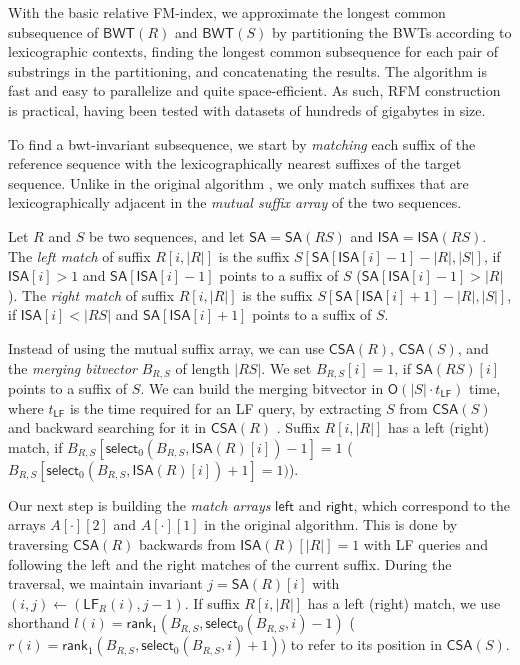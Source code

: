 \documentclass[a4paper,11pt]{llncs}
\newcommand{\abs}[1]{\ensuremath{\lvert #1 \rvert}}
\newcommand{\BWT}{\textsf{BWT}}
\newcommand{\RFM}{\textsf{RFM}}
\newcommand{\mSA}{\ensuremath{\mathsf{SA}}}
\newcommand{\mISA}{\ensuremath{\mathsf{ISA}}}
\newcommand{\mBWT}{\ensuremath{\mathsf{BWT}}}
\newcommand{\mCSA}{\ensuremath{\mathsf{CSA}}}
\newcommand{\mleft}{\ensuremath{\mathsf{left}}}
\newcommand{\mright}{\ensuremath{\mathsf{right}}}
\newcommand{\LF}{\textsf{LF}}
\newcommand{\mLF}{\ensuremath{\mathsf{LF}}}
\newcommand{\mrank}{\ensuremath{\mathsf{rank}}}
\newcommand{\mselect}{\ensuremath{\mathsf{select}}}
\newcommand{\Oh}{\ensuremath{\mathsf{O}}}
\begin{document}
With the basic relative FM-index, we approximate the longest common subsequence of $\mBWT(R)$ and $\mBWT(S)$ by partitioning the \BWT{}s according to lexicographic contexts, finding the longest common subsequence for each pair of substrings in the partitioning, and concatenating the results. The algorithm is fast and easy to parallelize and quite space-efficient. As such, \RFM{} construction is practical, having been tested with datasets of hundreds of gigabytes in size.

To find a bwt-invariant subsequence, we start by \emph{matching} each suffix of the reference sequence with the lexicographically nearest suffixes of the target sequence. Unlike in the original algorithm \cite{Belazzougui2014}, we only match suffixes that are lexicographically adjacent in the \emph{mutual suffix array} of the two sequences.

\begin{definition}
Let $R$ and $S$ be two sequences, and let $\mSA = \mSA(RS)$ and $\mISA = \mISA(RS)$. The \emph{left match} of suffix $R[i,\abs{R}]$ is the suffix $S[\mSA[\mISA[i]-1] - \abs{R}, \abs{S}]$, if $\mISA[i] > 1$ and $\mSA[\mISA[i]-1]$ points to a suffix of $S$ ($\mSA[\mISA[i]-1] > \abs{R}$). The \emph{right match} of suffix $R[i,\abs{R}]$ is the suffix $S[\mSA[\mISA[i]+1] - \abs{R}, \abs{S}]$, if $\mISA[i] < \abs{RS}$ and $\mSA[\mISA[i]+1]$ points to a suffix of $S$.
\end{definition}

Instead of using the mutual suffix array, we can use $\mCSA(R)$, $\mCSA(S)$, and the \emph{merging bitvector} $B_{R,S}$ of length $\abs{RS}$. We set $B_{R,S}[i] = 1$, if $\mSA(RS)[i]$ points to a suffix of $S$. We can build the merging bitvector in $\Oh(\abs{S} \cdot t_{\mLF})$ time, where $t_{\mLF}$ is the time required for an \LF{} query, by extracting $S$ from $\mCSA(S)$ and backward searching for it in $\mCSA(R)$ \cite{Siren2009}. Suffix $R[i,\abs{R}]$ has a left (right) match, if $B_{R,S}[\mselect_{0}(B_{R,S}, \mISA(R)[i])-1] = 1$ ($B_{R,S}[\mselect_{0}(B_{R,S}, \mISA(R)[i])+1] = 1)$).

Our next step is building the \emph{match arrays} $\mleft$ and $\mright$, which correspond to the arrays $A[\cdot][2]$ and $A[\cdot][1]$ in the original algorithm. This is done by traversing $\mCSA(R)$ backwards from $\mISA(R)[\abs{R}] = 1$ with \LF{} queries and following the left and the right matches of the current suffix. During the traversal, we maintain invariant $j = \mSA(R)[i]$ with $(i,j) \leftarrow (\mLF_{R}(i), j-1)$. If suffix $R[i,\abs{R}]$ has a left (right) match, we use shorthand $l(i) = \mrank_{1}(B_{R,S}, \mselect_{0}(B_{R,S}, i)-1)$ ($r(i) = \mrank_{1}(B_{R,S}, \mselect_{0}(B_{R,S}, i)+1)$) to refer to its position in $\mCSA(S)$.
\end{document}
